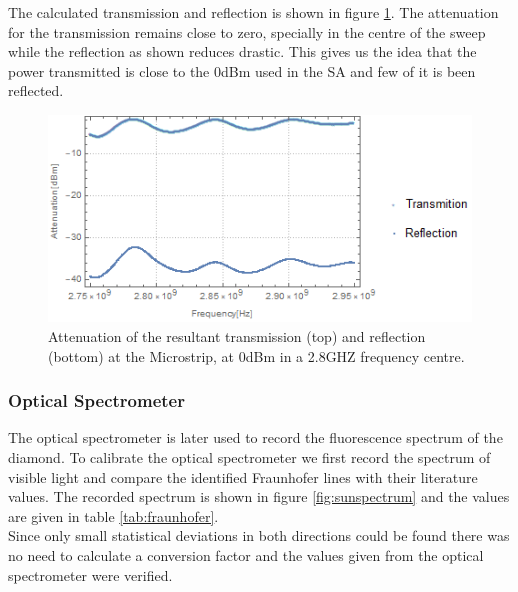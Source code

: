 The calculated transmission and reflection is shown in figure \ref{fig:microstrip-trasm-eflect}. The attenuation for the transmission remains close to zero, specially in the centre of the sweep while the reflection as shown reduces drastic. This gives us the idea that the power transmitted is close to the 0dBm used in the SA and few of it is been reflected.

\begin{figure}
	\centering
	\includegraphics[width=0.7\linewidth]{../figures/microstrip-trasm-eflect}
	\caption[Microstrip transmission and reflection]{Attenuation of the resultant transmission (top) and reflection (bottom) at the Microstrip, at 0dBm in a 2.8GHZ frequency centre.}
	\label{fig:microstrip-trasm-eflect}
\end{figure}

\subsubsection{Optical Spectrometer}
The optical spectrometer is later used to record the fluorescence spectrum of the diamond. To calibrate the optical spectrometer we first record the spectrum of visible light and compare the identified Fraunhofer lines with their literature values. The recorded spectrum is shown in figure \ref{fig:sunspectrum} and the values are given in table \ref{tab:fraunhofer}.\\

Since only small statistical deviations in both directions could be found there was no need to calculate a conversion factor and the values given from the optical spectrometer were verified. \\

